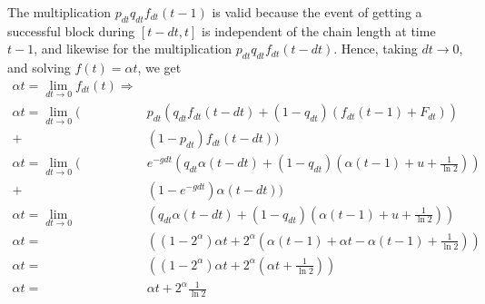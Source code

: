 The multiplication $p_{dt} q_{dt} f_{dt} (t - 1)$ is valid because the event of getting a successful block
during $[t - dt, t]$ is independent of the chain length at time $t - 1$, and likewise for the multiplication
$p_{dt} q_{dt} f_{dt}(t - dt)$.
Hence, taking $dt \to 0$, and solving $f(t) = \alpha t$, we get
\begin{align*}
  \alpha t = \lim_{dt \to 0} f_{dt}(t) \Rightarrow\\
  \alpha t = \lim_{dt \to 0} (&p_{dt}\left(q_{dt}f_{dt}(t - dt) + (1 - q_{dt})(f_{dt}(t - 1) + F_{dt})\right)\\ + &(1 - p_{dt})f_{dt}(t - dt))\\
  \alpha t = \lim_{dt \to 0} (&e^{-gdt}\left(q_{dt} \alpha (t - dt) + (1 - q_{dt})\left(\alpha (t - 1) + u + \frac{1}{\ln2}\right)\right)\\ + &(1 - e^{-gdt})\alpha (t - dt))\\
  \alpha t = \lim_{dt \to 0} &\left(q_{dt} \alpha (t - dt) + (1 - q_{dt})\left(\alpha (t - 1) + u + \frac{1}{\ln2}\right)\right)\\
  \alpha t = &\left((1 - 2^\alpha) \alpha t + 2^\alpha\left(\alpha (t - 1) + \alpha t - \alpha (t - 1) + \frac{1}{\ln2}\right)\right)\\
  \alpha t = &\left((1 - 2^\alpha) \alpha t + 2^\alpha\left(\alpha t + \frac{1}{\ln2}\right)\right)\\
  \alpha t = &\alpha t + 2^\alpha\frac{1}{\ln2}\\
\end{align*}